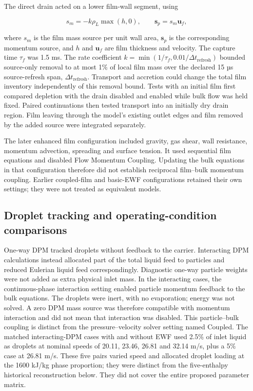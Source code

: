 The direct drain acted on a lower film-wall segment, using

\[s_m=-k\rho_L\max(h,0),\qquad \boldsymbol{s}_p=s_m\boldsymbol{u}_f,\]

where \(s_m\) is the film mass source per unit wall area, \(\boldsymbol{s}_p\) is the corresponding momentum source, and \(h\) and \(\boldsymbol{u}_f\) are film thickness and velocity. The capture time \(\tau_f\) was 1.5 ms. The rate coefficient \(k=\min(1/\tau_f,0.01/\Delta t_{\mathrm{refresh}})\) bounded source-only removal to at most 1\% of local film mass over the declared 15 µs source-refresh span, \(\Delta t_{\mathrm{refresh}}\). Transport and accretion could change the total film inventory independently of this removal bound. Tests with an initial film first compared depletion with the drain disabled and enabled while bulk flow was held fixed. Paired continuations then tested transport into an initially dry drain region. Film leaving through the model's existing outlet edges and film removed by the added source were integrated separately.

The later enhanced film configuration included gravity, gas shear, wall resistance, momentum advection, spreading and surface tension. It used sequential film equations and disabled Flow Momentum Coupling. Updating the bulk equations in that configuration therefore did not establish reciprocal film--bulk momentum coupling. Earlier coupled-film and basic-EWF configurations retained their own settings; they were not treated as equivalent models.

\subsection{Droplet tracking and operating-condition comparisons}

One-way DPM tracked droplets without feedback to the carrier. Interacting DPM calculations instead allocated part of the total liquid feed to particles and reduced Eulerian liquid feed correspondingly. Diagnostic one-way particle weights were not added as extra physical inlet mass. In the interacting cases, the continuous-phase interaction setting enabled particle momentum feedback to the bulk equations. The droplets were inert, with no evaporation; energy was not solved. A zero DPM mass source was therefore compatible with momentum interaction and did not mean that interaction was disabled. This particle--bulk coupling is distinct from the pressure--velocity solver setting named Coupled. The matched interacting-DPM cases with and without EWF used 2.5\% of inlet liquid as droplets at nominal speeds of 20.11, 23.46, 26.81 and 32.14 m/s, plus a 5\% case at 26.81 m/s. These five pairs varied speed and allocated droplet loading at the 1600 kJ/kg phase proportion; they were distinct from the five-enthalpy historical reconstruction below. They did not cover the entire proposed parameter matrix.

